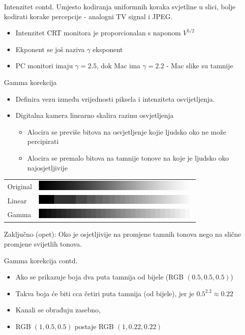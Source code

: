 \documentclass[9pt]{beamer}
\begin{document}
\begin{frame}{Intenzitet contd.}
	Umjesto kodiranja uniformnih koraka svjetline u slici, bolje kodirati korake percepcije - analogni TV signal i JPEG.
	\begin{itemize}
		\item Intenzitet CRT monitora je proporcionalan s naponom $V^{5/2}$ 
		\item Ekponent se još naziva $\gamma$ eksponent
		\item PC monitori imaju $\gamma = 2.5$, dok Mac ima $\gamma = 2.2$ - Mac slike su tamnije
	\end{itemize}
	
\end{frame}

\begin{frame}{Gamma korekcija}
	\begin{itemize}
		\item Definira vezu između vrijednosti piksela i intenziteta osvijetljenja.
		\item Digitalna kamera linearno skalira razinu osvjetljenja
		\begin{itemize}
			\item Alocira se previše bitova na osvjetljenje kojie ljudsko oko ne može percipirati
			\item Alocira se premalo bitova na tamnije tonove na koje je ljudsko oko najosjetljivije
		\end{itemize}
	\end{itemize}
	
	\begin{tabular}{ll}
		Original &\includegraphics[height=0.5cm]{slike/05_gamma_gradient3b.png}\\
		Linear&  \includegraphics[height=0.5cm]{slike/05_gamma_gradient2b.png}\\
		Gamma&  \includegraphics[height=0.5cm]{slike/05_gamma_gradient1b.png}
	\end{tabular}
	Zaključno (opet): Oko je osjetljivije na promjene tamnih tonova nego na slične promjene svijetlih tonova.
	
\end{frame}
\begin{frame}{Gamma korekcija contd. }
	\begin{itemize}
		\item Ako se prikazuje boja dva puta tamnija od bijele (RGB $(0.5, 0.5, 0.5)$)
		\item Takva boja će biti cca četiri puta tamnija (od bijele), jer je $0.5^{2.2} \approx 0.22$
		\item Kanali se obrađuju zasebno,  
		\item RGB $(1, 0.5, 0.5)$ postaje RGB $(1, 0.22, 0.22)$
	\end{itemize}
\end{frame}
\end{document}
